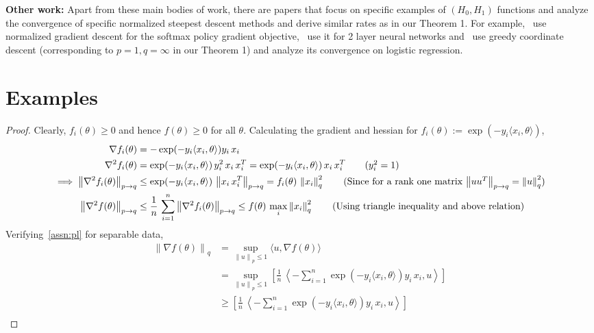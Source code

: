 \documentclass{article}
\newcommand{\normsq}[1]{\left\|#1 \right\|^{2}}
\newcommand{\norm}[1]{\left\|#1 \right\|}
\begin{document}
    \textbf{Other work:} Apart from these main bodies of work, there are papers that focus on specific examples of $(H_0, H_1)$ functions and analyze the convergence of specific normalized steepest descent methods and derive similar rates as in our Theorem 1. For example,~\citet{mei2021leveraging} use normalized gradient descent for the softmax policy gradient objective,~\citet{taheri2023fast} use it for 2 layer neural networks and~\citet{axiotis2023gradient} use greedy coordinate descent (corresponding to $p = 1, q = \infty$ in our Theorem 1) and analyze its convergence on logistic regression. 
\section{Examples}
\label{app:examples}

\exponential*
\begin{proof}
Clearly, $f_i(\theta) \geq 0$ and hence $f(\theta) \geq 0$ for all $\theta$. Calculating the gradient and hessian for $f_i(\theta) := \exp(-y_i \langle x_i, \theta \rangle)$, 
\begin{align*}
\nabla f_i(\theta) &=  -\exp(-y_i \langle x_i, \theta \rangle) y_i \, x_i \\
\nabla^2 f_i(\theta) & = \exp(-y_i \langle x_i, \theta \rangle) \, y_i^2 \, x_i \, x_i^T = \exp(-y_i \langle x_i, \theta \rangle) \, x_i \, x_i^T \tag{$y_i^2 = 1$} \\
\implies \norm{\nabla^2 f_i(\theta)}_{p \to q} & \leq \exp(-y_i \langle x_i, \theta \rangle) \, \norm{x_i \, x_i^T}_{p \to q} = f_i(\theta) \, \normsq{x_i}_{q} \tag{Since for a rank one matrix $\norm{u u^T}_{p \to q} = \normsq{u}_q$} \\
\norm{\nabla^2 f(\theta)}_{p \to q} & \leq \frac{1}{n} \,\sum_{i = 1}^{n} \norm{\nabla^2 f_i(\theta)}_{p \to q} \leq f(\theta) \, \max_i \normsq{x_i}_q \tag{Using triangle inequality and above relation} 
\end{align*}
Verifying~\cref{assn:pl} for separable data, 
\begin{align*}
\norm{\nabla f(\theta)}_q &= \sup_{\norm{u}_p \leq 1} \langle u, \nabla f(\theta) \rangle \\  
& = \sup_{\norm{u}_p \leq 1} \left[ \frac{1}{n} \, \left\langle -\sum_{i = 1}^{n} \exp(-y_i \langle x_i, \theta \rangle) y_i \, x_i, u \right \rangle \right] \\
& \geq \left[ \frac{1}{n} \, \left\langle -\sum_{i = 1}^{n} \exp(-y_i \langle x_i, \theta \rangle) y_i \, x_i, u \right \rangle \right] \tag{for all $u$ s.t. $\norm{u}_p \leq 1$} \\

\end{align*}
\end{proof}
\end{document}
